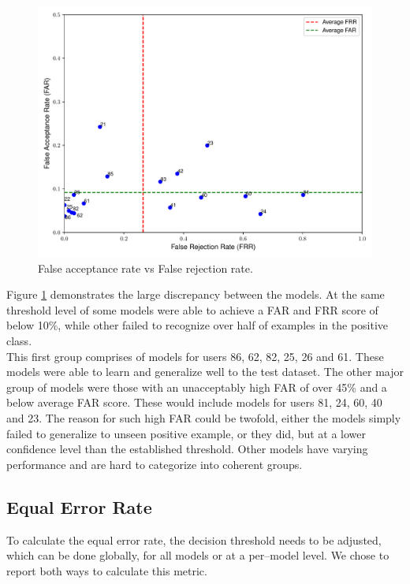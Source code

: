 \begin{figure}[H]
	\centering
	\includegraphics[width=\textwidth]{images/far_vs_frr.pdf} 	
	\caption{False acceptance rate vs False rejection rate.}
	\label{fig:frr_vs_far_all_models_base}
\end{figure}

Figure \ref{fig:frr_vs_far_all_models_base} demonstrates the large discrepancy between the models. At the same threshold level of some models were able to achieve a FAR and FRR score of below 10\%, while other failed to recognize over half of examples in the positive class. \\
This first group comprises of models for users 86, 62, 82, 25, 26 and 61. These models were able to learn and generalize well to the test dataset.
The other major group of models were those with an unacceptably high FAR of over 45\% and a below average FAR score. These would include models for users 81, 24, 60, 40 and 23. The reason for such high FAR could be twofold, either the models simply failed to generalize to unseen positive example, or they did, but at a lower confidence level than the established threshold. Other models have varying performance and are hard to categorize into coherent groups.

\subsection{Equal Error Rate} \label{subsec_eer}
To calculate the equal error rate, the decision threshold needs to be adjusted, which can be done globally, for all models or at a per--model level. We chose to report both ways to calculate this metric. 

